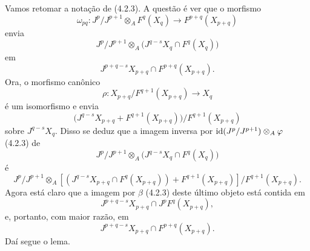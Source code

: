 \begin{prooftext}[Demonstração de 4.2.7]
Vamos retomar a notação de (4.2.3). A questão é ver que o morfismo
\[
\omega_{pq}:J^p/J^{p+1}\otimes_A F^q(X_q)\longrightarrow F^{p+q}(X_{p+q})
\]
envia
\[
J^p/J^{p+1}\otimes_A
\bigl(J^{q-s}X_q\cap F^q(X_q)\bigr)
\]
em
\[
J^{p+q-s}X_{p+q}\cap F^{p+q}(X_{p+q}).
\]
Ora, o morfismo canônico
\[
\rho:X_{p+q}/F^{q+1}(X_{p+q})\longrightarrow X_q
\]
é um isomorfismo e envia
\[
\bigl(J^{q-s}X_{p+q}+F^{q+1}(X_{p+q})\bigr)/F^{q+1}(X_{p+q})
\]
sobre \(J^{q-s}X_q\). Disso se deduz que a imagem inversa por
\(\operatorname{id}(J^p/J^{p+1})\otimes_A\varphi\) (4.2.3) de
\[
J^p/J^{p+1}\otimes_A
\bigl(J^{q-s}X_q\cap F^q(X_q)\bigr)
\]
é
\[
J^p/J^{p+1}\otimes_A
[(J^{q-s}X_{p+q}\cap F^q(X_{p+q}))+F^{q+1}(X_{p+q})]/F^{q+1}(X_{p+q}).
\]
Agora está claro que a imagem por \(\beta\) (4.2.3) deste último objeto está contida em
\[
J^{p+q-s}X_{p+q}\cap J^pF^q(X_{p+q}),
\]
e, portanto, com maior razão, em
\[
J^{p+q-s}X_{p+q}\cap F^{p+q}(X_{p+q}).
\]
Daí segue o lema.
\end{prooftext}

